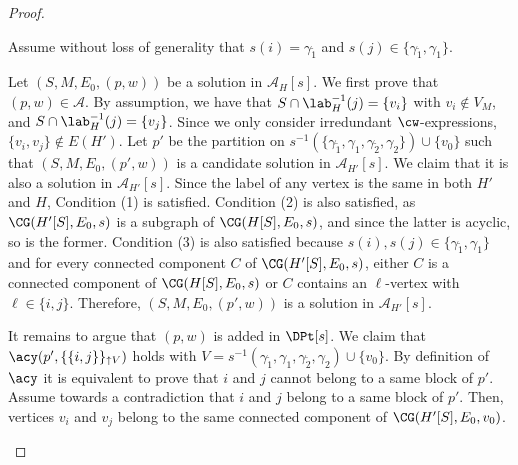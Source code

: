 \begin{proof}
	\begin{claimproof}
		Assume without loss of generality that $s(i) = \gamma_{\tilde{1}}$ and $s(j) \in \{ \gamma_{\tilde{1}}, \gamma_1 \}$.

		Let $(S,M,E_0,(p,w))$ be a solution in $\mathcal{A}_H[s]$.
		We first prove that $(p,w) \in \mathcal{A}$.
		By assumption, we have that $S \cap \lab^{-1}_{H}(j) = \{v_i\}$ with $v_i \notin V_M$,
		and $S \cap \lab^{-1}_{H}(j) = \{v_j\}$.
		Since we only consider irredundant $\cw$-expressions, $\{v_i, v_j\} \notin E(H')$.
		Let $p'$ be the partition on $s^{-1}(\{\gamma_{\tilde{1}}, \gamma_1, \gamma_{\tilde{2}},\gamma_2\}) \cup \{v_0\}$ such that
		$(S,M,E_0,(p',w))$ is a candidate solution in $\mathcal{A}_{H'}[s]$.
		We claim that it is also a solution in $\mathcal{A}_{H'}[s]$.
		Since the label of any vertex is the same in both $H'$ and $H$, Condition (1) is satisfied.
		Condition (2) is also satisfied, as $\CG(H'[S],E_0,s)$ is a subgraph of $\CG(H[S],E_0,s)$,
		and since the latter is acyclic, so is the former.
		Condition (3) is also satisfied because $s(i),s(j) \in \{ \gamma_{\tilde{1}}, \gamma_1 \}$
		and for every connected component $C$ of $\CG(H'[S],E_0,s)$,
		either $C$ is a connected component of $\CG(H[S],E_0,s)$ or
		$C$ contains an $\ell$-vertex with $\ell \in \{i,j\}$.
		Therefore, $(S,M,E_0,(p',w))$ is a solution in $\mathcal{A}_{H'}[s]$.

		It remains to argue that $(p,w)$ is added in $\DPt[s]$.
		We claim that $\acy(p', \{\{i,j\}\}_{\uparrow V })$ holds with $V=s^{-1}(\gamma_{\tilde{1}},\gamma_1,\gamma_{\tilde{2}},\gamma_{2}) \cup \{v_0\}$.
		By definition of $\acy$ it is equivalent to prove that $i$ and $j$ cannot belong to a same block of $p'$.
		Assume towards a contradiction that $i$ and $j$ belong to a same block of $p'$.
		Then, vertices $v_i$ and $v_j$ belong to the same connected component of $\CG(H'[S],E_0,v_0)$.
	\end{claimproof}


\end{proof}
